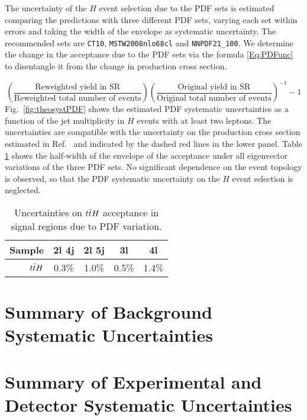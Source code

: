 The uncertainty of the \ttbar$H$ event selection due to the PDF sets is estimated comparing the predictions with three different PDF sets, varying each set within errors and taking the width of the envelope as systematic uncertainty. The recommended sets are \verb+CT10+, \verb+MSTW2008nlo68cl+ and \verb+NNPDF21_100+. 
We determine the change in the acceptance due to the PDF sets via the formula \ref{Eq:PDFunc} to disentangle it from the change in production cross section.

\begin{equation} \label{Eq:PDFunc}
\left(\frac{\textrm{Reweighted yield in SR}}{\textrm{Reweighted total number of events}}\right)\left(\frac{\textrm{Original yield in SR}}{\textrm{Original total number of events}}\right)^{-1}-1
\end{equation}
Fig.~\ref{fig:theosystPDF} shows the estimated PDF systematic uncertainties as a function of the jet multiplicity in \ttbar$H$ events with at least two leptons. The uncertainties are compatible with the uncertainty on the production cross section estimated in Ref.~\cite{Heinemeyer:2013tqa} and indicated by the dashed red lines in the lower panel. 
Table \ref{tab:pdfaccttH} shows the half-width of the envelope of the acceptance under all eigenvector variations of the three PDF sets.
No significant dependence on the event topology is observed, so that the PDF systematic uncertainty on the \ttbar$H$ event selection is neglected.

\begin{table}
\begin{center}
\caption{\label{tab:pdfaccttH}Uncertainties on $t\bar{t} H$ acceptance in signal
  regions due to PDF variation.}
\begin{tabular}{r|c|c|c|c}
Sample & 2l 4j & 2l 5j & 3l & 4l\\
\hline
$t\bar{t} H$ & 0.3\% & 1.0\% & 0.5\% & 1.4\%\\
\end{tabular}
\end{center}
\end{table}




\section{Summary of Background Systematic Uncertainties}


\section{Summary of Experimental and Detector Systematic Uncertainties}


